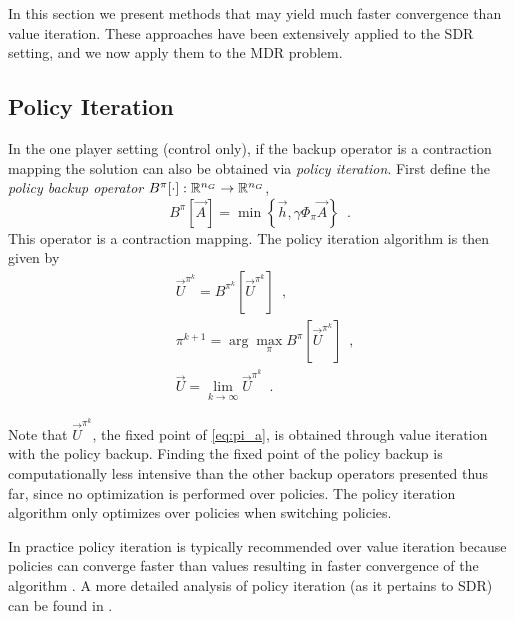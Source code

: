 In this section we present methods that may yield much faster convergence than value iteration. These approaches have been extensively applied to the SDR setting, and we now apply them to the MDR problem. 

\subsection{Policy Iteration}

In the one player setting (control only), if the backup operator is a contraction mapping the solution can also be obtained via \emph{policy iteration}. First define the \emph{policy backup operator} $B^{\pi}[\cdot]: \mathbb{R}^{n_G} \rightarrow \mathbb{R}^{n_G}$, 
%
\begin{equation} \label{eq:backup_policy}
B^{\pi}[\vec{A}] = \min\left\{ \vec{h}, \gamma \Phi_{\pi} \vec{A} \right \} \enspace.
\end{equation}%
\noindent This operator is a contraction mapping. The policy iteration algorithm is then given by
%
\begin{subequations}\label{eq:pi}
\begin{align}
&\vec{U}^{\pi^k} = B^{\pi^k}[\vec{U}^{\pi^k}] \label{eq:pi_a} \enspace,\\
&\pi^{k+1} = \arg\underset{\pi}{\max}B^{\pi}[\vec{U}^{\pi^k}] \enspace,\\ 
&\vec{U} = \lim_{k\rightarrow \infty} \vec{U}^{\pi^k}\enspace.
\end{align}
\end{subequations}

Note that ${\vec{U}^{\pi^k}}$, the fixed point of \eqref{eq:pi_a}, is obtained through value iteration with the policy backup. Finding the fixed point of the policy backup is computationally less intensive than the other backup operators presented thus far, since no optimization is performed over policies. The policy iteration algorithm only optimizes over policies when switching policies.  

In practice policy iteration is typically recommended over value iteration because policies can converge faster than values resulting in faster convergence of the algorithm \cite{Russell2003}. A more detailed analysis of policy iteration (as it pertains to SDR) can be found in \cite{Bokanowski2009,Howard1964, Puterman1979}. 

